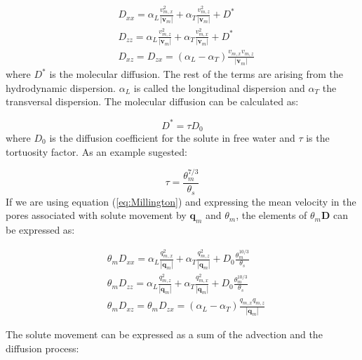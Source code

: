 \documentclass{report}
\begin{document}
\begin{equation}
\begin{split}
&D_{xx}=\alpha_L\frac{v_{m,x}^{2}}{|\mathbf{v}_{m}|}+\alpha_T\frac{v_{m,z}^{2}}
{|\mathbf{v}_{m}|}+D^* \\
&D_{zz}=\alpha_L\frac{v_{m,z}^{2}}{|\mathbf{v}_{m}|}+\alpha_T\frac{v_{m,x}^{2}}
{|\mathbf{v}_{m}|}+D^* \\
&D_{xz}=D_{zx}=(\alpha_L-\alpha_T)\frac{v_{m,x}v_{m,z}}{|\mathbf{v}_{m}|}
\end{split}
\end{equation}
%
where $D^*$ is the molecular diffusion. The rest of the terms are
arising from the hydrodynamic dispersion. $\alpha_L$ is called the
longitudinal dispersion and
$\alpha_T$ the transversal dispersion.
The molecular diffusion can be calculated as:

\begin{equation}
D^*=\tau D_0
\end{equation}
%
where $D_0$ is the diffusion
coefficient for the solute in free
water and $\tau$ is the tortuosity factor.
As an example \cite{Millington} sugested:

\begin{equation}
\tau=\frac{\theta_{m}^{7/3}}{\theta_s} \label{eq:Millington}
\end{equation}
%
If we are using equation (\ref{eq:Millington}) and expressing the
mean velocity in the pores associated with solute movement by
$\mathbf{q}_{m}$ and $\theta_{m}$, the elements of
$\theta_{m}\mathbf{D}$ can be expressed as:

\begin{equation}
\begin{split}
&\theta_{m}
D_{xx}=\alpha_L\frac{q_{m,x}^{2}}{|\mathbf{q}_m|}+\alpha_T\frac{q_{m,z}^{2}}
{|\mathbf{q}_{m}|}+D_0\frac{\theta_{m}^{10/3}}{\theta_s} \\
&\theta_{m}
D_{zz}=\alpha_L\frac{q_{m,z}^{2}}{|\mathbf{q}_{m}|}+\alpha_T\frac{q_{m,x}^{2}}
{|\mathbf{q}_{m}|}+D_0\frac{\theta_{m}^{10/3}}{\theta_s} \\
&\theta_{m} D_{xz}=\theta_{m}
  D_{zx}=(\alpha_L-\alpha_T)\frac{q_{m,x}q_{m,z}}{|\mathbf{q}_{m}|}
\end{split}
\label{eq:thetad}
\end{equation}

The solute movement can be expressed as a sum of the advection and
the diffusion process:
\end{document}
